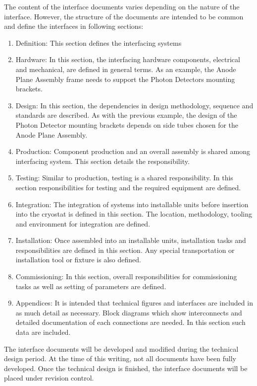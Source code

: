 The content of the interface documents varies depending on the nature
of the interface. However, the structure of the documents are intended
to be common and define the interfaces in following sections:
\begin{enumerate}
 \item Definition: This section defines the interfacing systems
 \item Hardware: In this section, the interfacing hardware components,
   electrical and mechanical, are defined in general terms. As an
   example, the Anode Plane Assembly frame needs to support the Photon
   Detectors mounting brackets.
 \item Design: In this section, the dependencies in design
   methodology, sequence and standards are described. As with the
   previous example, the design of the Photon Detector mounting
   brackets depends on side tubes chosen for the Anode Plane Assembly.
 \item Production: Component production and an overall assembly is
   shared among interfacing system. This section details the
   responsibility.
 \item Testing: Similar to production, testing is a shared
   responsibility. In this section responsibilities for testing and
   the required equipment are defined.
 \item Integration: The integration of systems into installable units
   before insertion into the cryostat is defined in this section. The
   location, methodology, tooling and environment for integration are
   defined.
 \item Installation: Once assembled into an installable units,
   installation tasks and responsibilities are defined in this
   section. Any special transportation or installation tool or fixture
   is also defined.
 \item Commissioning: In this section, overall responsibilities for
   commissioning tasks as well as setting of parameters are defined.
 \item Appendices: It is intended that technical figures and
   interfaces are included in as much detail as necessary. Block
   diagrams which show interconnects and detailed documentation of
   each connections are needed. In this section such data are
   included.
\end{enumerate}

The interface documents will be developed and modified during the
technical design period. At the time of this writing, not all
documents have been fully developed. Once the technical design is
finished, the interface documents will be placed under revision
control.
